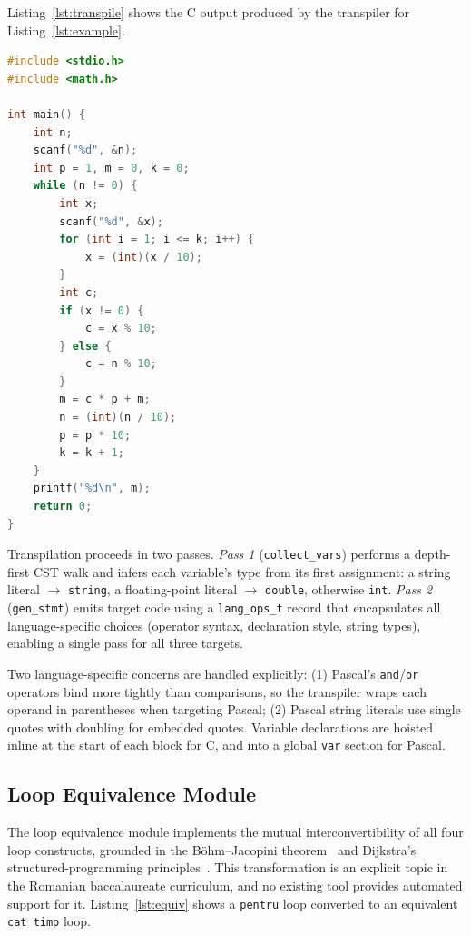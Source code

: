 \documentclass[conference]{IEEEtran}
\begin{document}
Listing~\ref{lst:transpile} shows the C output produced by the transpiler for
Listing~\ref{lst:example}.

\begin{lstlisting}[language=C, caption={C code generated by the transpiler for the program in Listing~\ref{lst:example}.}, label=lst:transpile, float=tp]
#include <stdio.h>
#include <math.h>

int main() {
    int n;
    scanf("%d", &n);
    int p = 1, m = 0, k = 0;
    while (n != 0) {
        int x;
        scanf("%d", &x);
        for (int i = 1; i <= k; i++) {
            x = (int)(x / 10);
        }
        int c;
        if (x != 0) {
            c = x % 10;
        } else {
            c = n % 10;
        }
        m = c * p + m;
        n = (int)(n / 10);
        p = p * 10;
        k = k + 1;
    }
    printf("%d\n", m);
    return 0;
}
\end{lstlisting}

Transpilation proceeds in two passes.  \emph{Pass 1} (\texttt{collect\_vars})
performs a depth-first CST walk and infers each variable's type from its first
assignment: a string literal $\to$ \texttt{string}, a floating-point
literal $\to$ \texttt{double}, otherwise \texttt{int}.  \emph{Pass 2}
(\texttt{gen\_stmt}) emits target code using a \texttt{lang\_ops\_t} record
that encapsulates all language-specific choices (operator syntax, declaration
style, string types), enabling a single pass for all three targets.

Two language-specific concerns are handled explicitly: (1) Pascal's
\texttt{and}/\texttt{or} operators bind more tightly than comparisons, so the
transpiler wraps each operand in parentheses when targeting Pascal; (2) Pascal
string literals use single quotes with doubling for embedded quotes.  Variable
declarations are hoisted inline at the start of each block for C, and into a
global \texttt{var} section for Pascal.

\subsection{Loop Equivalence Module}

The loop equivalence module implements the mutual interconvertibility of all
four loop constructs, grounded in the B\"{o}hm--Jacopini
theorem~\cite{bohm-jacopini} and Dijkstra's structured-programming
principles~\cite{dijkstra1968goto}.  This transformation is an explicit topic
in the Romanian baccalaureate curriculum, and no existing tool provides
automated support for it.  Listing~\ref{lst:equiv} shows a \texttt{pentru}
loop converted to an equivalent \texttt{cat timp} loop.
\end{document}
